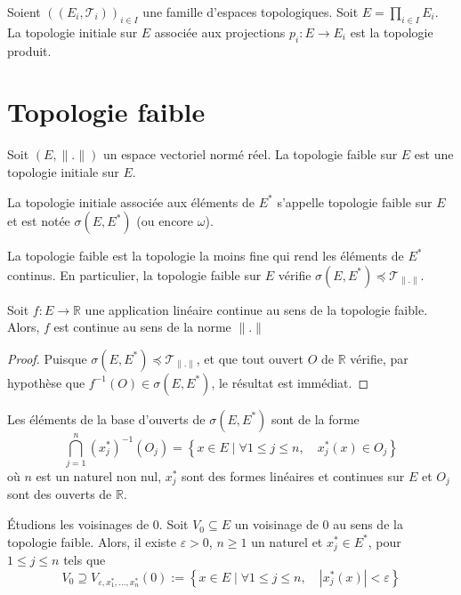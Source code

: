 \begin{ex}
  Soient $((E_i, \mathcal{T}_i))_{i\in I}$ une famille d'espaces topologiques.
  Soit $E = \prod_{i\in I} E_i$. La topologie initiale sur $E$ associée
  aux projections $p_i: E\to E_i$ est la topologie produit.
\end{ex}


\section{Topologie faible}
Soit $(E, \|.\|)$ un espace vectoriel normé réel. La topologie
faible sur $E$ est une topologie initiale sur $E$.
\begin{df}
  La topologie initiale associée aux éléments de $E^*$
  s'appelle topologie faible sur $E$ et est notée $\sigma(E, E^*)$
  (ou encore $\omega$).
\end{df}

La topologie faible est la topologie la moins fine qui rend les
éléments de $E^*$ continus. En particulier, la topologie faible
sur $E$ vérifie $\sigma(E, E^*)\preceq \mathcal{T}_{\|.\|}$.

\begin{lem}\label{lem:formfaib}
  Soit $f: E\to\mathbb R$ une application linéaire
  continue au sens de la topologie faible. Alors,
  $f$ est continue au sens de la norme $\|.\|$
\end{lem}

\begin{proof}
  Puisque $\sigma(E, E^*)\preceq \mathcal{T}_{\|.\|}$, et
  que tout ouvert $O$ de $\mathbb R$ vérifie, par
  hypothèse que $f^{-1}(O)\in\sigma(E, E^*)$, le
  résultat est immédiat.
\end{proof}

Les éléments de la base d'ouverts de $\sigma(E, E^*)$ sont de la forme
\begin{equation*}
  \bigcap_{j=1}^n (x_j^*)^{-1}(O_j) =
  \left\{ x\in E\mid \forall 1\leq j\leq n,\quad x_j^*(x)\in O_j\right\}
\end{equation*}
où $n$ est un naturel non nul, $x_j^*$ sont des formes linéaires et continues
sur $E$ et $O_j$ sont des ouverts de $\mathbb R$.

\'{E}tudions les voisinages de $0$. Soit $V_0\subseteq E$ un voisinage
de $0$ au sens de la topologie faible. Alors, il existe $\varepsilon > 0$,
$n\geq 1$ un naturel et $x_j^*\in E^*$, pour $1\leq j\leq n$ tels que
\begin{equation*}
  V_0\supseteq V_{\varepsilon, x_1^*, \ldots, x_n^*}(0) :=
  \left\{ x\in E\mid \forall 1\leq j\leq n,\quad
    |x_j^*(x)| < \varepsilon\right\}
\end{equation*}

